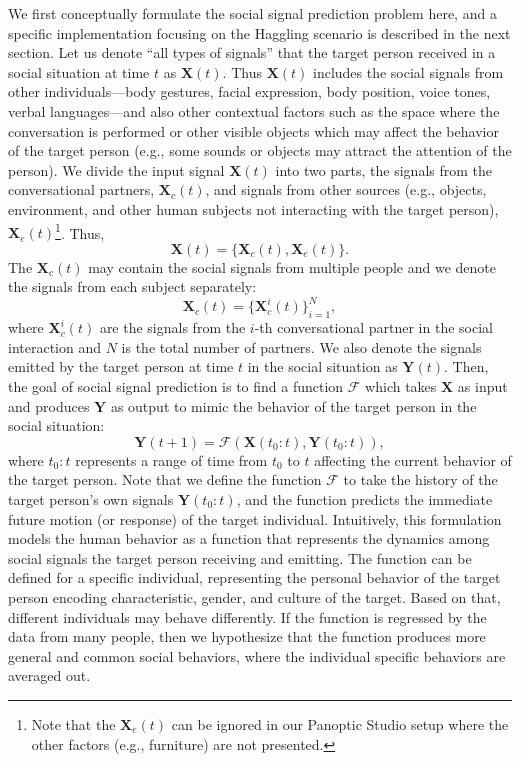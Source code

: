 We first conceptually formulate the social signal prediction problem here, and a specific implementation focusing on the Haggling scenario is described in the next section. Let us denote ``all types of signals'' that the target person received in a social situation at time $t$ as $\mathbf{X}(t)$. Thus $\mathbf{X}(t)$ includes the social signals from other individuals---body gestures, facial expression, body position, voice tones, verbal languages---and also other contextual factors such as the space where the conversation is performed or other visible objects which may affect the behavior of the target person (e.g., some sounds or objects may attract the attention of the person). We divide the input signal $\mathbf{X}(t)$ into two parts, the signals from the conversational partners, $\mathbf{X}_c(t)$, and signals from other sources (e.g., objects, environment, and other human subjects not interacting with the target person), $\mathbf{X}_e(t)$\footnote{Note that the  $\mathbf{X}_e (t)$ can be ignored in our Panoptic Studio setup where the other factors (e.g., furniture) are not presented.}.  Thus,
\begin{equation}
\mathbf{X} (t) = \{  \mathbf{X}_c (t), \mathbf{X}_e (t)\}.
\end{equation}
The $\mathbf{X}_c (t)$ may contain the social signals from multiple people and we denote the signals from each subject separately:
\begin{equation}
\mathbf{X}_c (t) = \{ \mathbf{X}_c^i (t) \}_{i=1}^N,
\end{equation}
where $\mathbf{X}^i_c (t)$ are the signals from the $i$-th conversational partner in the social interaction and $N$ is the total number of partners. 
We also denote the signals emitted by the target person at time $t$ in the social situation as $\mathbf{Y} (t)$.
Then, the goal of social signal prediction is to find a function $\mathcal{F}$ which takes $\mathbf{X}$ as input and produces $\mathbf{Y}$ as output to mimic the behavior of the target person in the social situation:
\begin{equation}
\mathbf{Y} (t+1) = \mathcal{F} \left( \mathbf{X} (t_0:t), \mathbf{Y} (t_0:t) \right),
\label{equation:socialPrediction_1}
\end{equation}
where $t_0:t$ represents a range of time from $t_0$ to $t$ affecting the current behavior of the target person. Note that we define the function $\mathcal{F}$ to take the history of the target person's own signals $\mathbf{Y} (t_0:t)$, and the function predicts the immediate future motion (or response) of the target individual. Intuitively, this formulation models the human behavior as a function that represents the dynamics among social signals the target person receiving and emitting. The function can be defined for a specific individual, representing the personal behavior of the target person encoding characteristic, gender, and culture of the target. Based on that, different individuals may behave differently. If the function is regressed by the data from many people, then we hypothesize that the function produces more general and common social behaviors, where the individual specific behaviors are averaged out.

